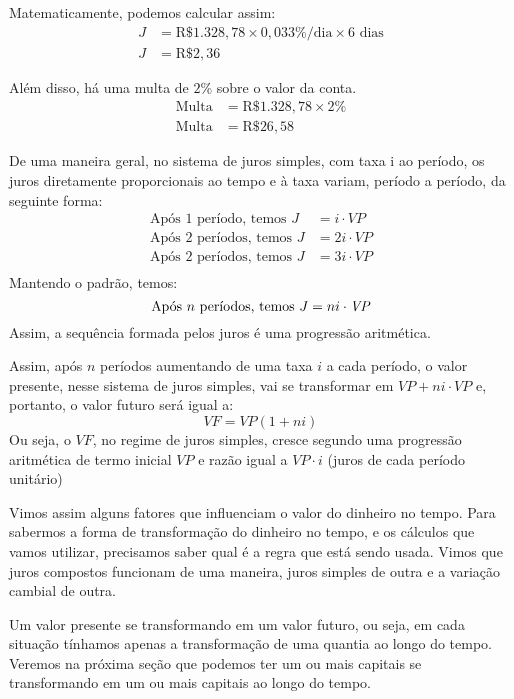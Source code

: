 Matematicamente, podemos calcular assim:
\begin{align*}
J&=\text{R\$ }1.328{,}78\times0{,}033\%/\text{dia}\times6\text{ dias}\\
J&=\text{R\$ }2{,}36
\end{align*}

Além disso, há uma multa de $2$\% sobre o valor da conta.
\begin{align*}
\text{Multa}&=\text{R\$ }1.328{,}78\times2\%\\
\text{Multa}&=\text{R\$ }26{,}58
\end{align*}

De uma maneira geral, no sistema de juros simples, com taxa i ao período, os juros diretamente proporcionais ao tempo e à taxa variam, período a período, da seguinte forma: 
\begin{align*}
\text{Após 1 período, temos } J&=i\cdot \mathit{VP} \\
\text{Após 2 períodos, temos } J&=2i\cdot \mathit{VP} \\
\text{Após 2 períodos, temos } J&=3i\cdot \mathit{VP} \\ 
\end{align*}
Mantendo o padrão, temos:
\begin{equation*}
\text{Após $n$ períodos, temos } J=ni\cdot \mathit{VP} \\ 
\end{equation*}
Assim, a sequência formada pelos juros é uma progressão aritmética.

Assim, após $n$ períodos aumentando de uma taxa $i$ a cada período, o valor presente, nesse sistema de juros simples, vai se transformar em $\mathit{VP}+ni\cdot\mathit{VP}$ e, portanto, o valor futuro será igual a:
{\Large
\begin{equation*}
\mathit{VF} = \mathit{VP}(1 + ni)
\end{equation*}}
Ou seja, o $\mathit{VF}$, no regime de juros simples, cresce segundo uma progressão aritmética de termo inicial $\mathit{VP}$ e razão igual a $\mathit{VP}\cdot i$ (juros de cada período unitário)

Vimos assim alguns fatores que influenciam o valor do dinheiro no tempo. Para sabermos a forma de transformação do dinheiro no tempo, e os cálculos que vamos utilizar, precisamos saber qual é a regra que está sendo usada. Vimos que juros compostos funcionam de uma maneira, juros simples de outra e a variação cambial de outra.

Um valor presente se transformando em um valor futuro, ou seja, em cada situação tínhamos apenas a transformação de uma quantia ao longo do tempo. Veremos na próxima seção que podemos ter um ou mais capitais se transformando em um ou mais capitais ao longo do tempo.

